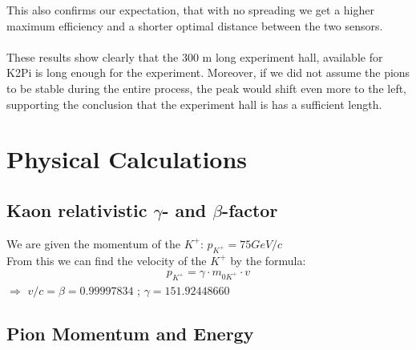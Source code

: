 \documentclass[a4paper,parskip,11pt, DIV12]{scrreprt}
\begin{document}
	This also confirms our expectation, that with no spreading we get a higher maximum efficiency and a shorter optimal distance between the two sensors.
	\\
	\\
	These results show clearly that the 300 m long experiment hall, available for K2Pi is long enough for the experiment. Moreover, if we did not assume the pions to be stable during the entire process, the peak would shift even more to the left, supporting the conclusion that the experiment hall is has a sufficient length.
	\clearpage
	
	\chapter{Physical Calculations}
	
	\section{Kaon relativistic $\gamma$- and $\beta$-factor} \label{sec:gammabeta}
	
	We are given the momentum of the $K^+$: $p_{K^+} = 75 GeV/c$\\
	From this we can find the velocity of the $K^+$ by the formula:
	\begin{align*}
		p_{K^+} = \gamma \cdot m_{0K^+} \cdot v
	\end{align*}
	$\Rightarrow$
	$v/c = \beta = 0.99997834$ ;
	$\gamma = 151.92448660$\\
	
	\section{Pion Momentum and Energy} \label{sec:pE}
	
\end{document}
